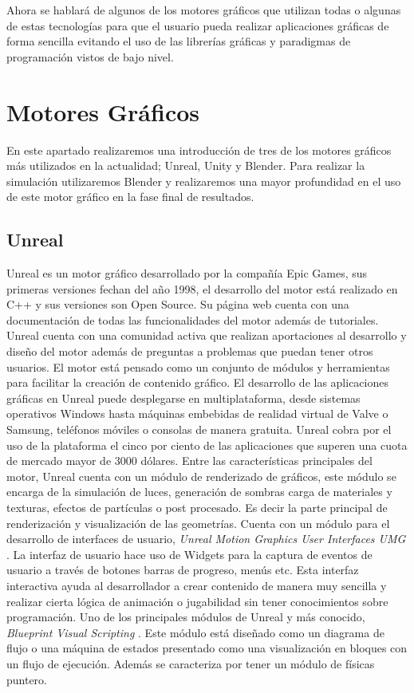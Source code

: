 \documentclass[a4paper]{book}
\begin{document}
Ahora se hablará de algunos de los motores gráficos que utilizan todas o algunas de estas tecnologías para que el usuario
pueda realizar aplicaciones gráficas de forma sencilla evitando el uso de las librerías gráficas y paradigmas de programación
vistos de bajo nivel.

\section{Motores Gráficos}
\label{sec:Motores}

En este apartado realizaremos una introducción de tres de los motores gráficos más utilizados
en la actualidad; Unreal, Unity y Blender. Para realizar la simulación utilizaremos Blender y
realizaremos una mayor profundidad en el uso de este motor gráfico en la fase final de resultados.

\subsection{Unreal}
\label{subsec:Unreal}

Unreal es un motor gráfico desarrollado por la compañía Epic Games, sus primeras versiones fechan del año
1998, el desarrollo del motor está realizado en C++ y sus versiones son Open Source. Su página web cuenta
con una documentación de todas las funcionalidades del motor además de tutoriales. Unreal cuenta con una
comunidad activa que realizan aportaciones al desarrollo y diseño del motor además de preguntas a problemas
que puedan tener otros usuarios. El motor está pensado como un conjunto de módulos y herramientas para
facilitar la creación de contenido gráfico. El desarrollo de las aplicaciones gráficas en Unreal puede desplegarse en
multiplataforma, desde sistemas operativos Windows hasta máquinas embebidas de realidad virtual de Valve o Samsung,
teléfonos móviles o consolas de manera gratuita. Unreal cobra por el uso de la plataforma el cinco por ciento de las aplicaciones que
superen una cuota de mercado mayor de 3000 dólares. Entre las características principales del motor, Unreal cuenta con un
módulo de renderizado de gráficos, este módulo se encarga de la simulación de luces, generación de sombras carga de materiales
y texturas, efectos de partículas o post procesado. Es decir la parte principal de renderización y visualización de las geometrías. Cuenta
con un módulo para el desarrollo de interfaces de usuario, \textit{Unreal Motion Graphics User Interfaces UMG} \cite{book:_unreal}. La 
interfaz de usuario hace uso de Widgets para la captura de eventos de usuario a través de botones barras
de progreso, menús etc. Esta interfaz interactiva ayuda al desarrollador a crear contenido de manera muy
sencilla y realizar cierta lógica de animación o jugabilidad sin tener conocimientos sobre programación. Uno de los principales módulos
de Unreal y más conocido, \textit{Blueprint Visual Scripting} \cite{book:_unreal_vs}. Este módulo está diseñado como un diagrama de flujo o una
máquina de estados presentado como una visualización en bloques con un flujo de ejecución. Además se caracteriza por tener un módulo de 
físicas puntero.
\end{document}
